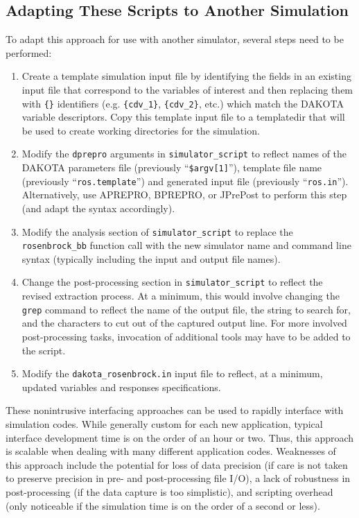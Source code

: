 \subsection{Adapting These Scripts to Another Simulation}

To adapt this approach for use with another simulator, several steps
need to be performed:

\begin{enumerate}
\item Create a template simulation input file by identifying the fields
  in an existing input file that correspond to the variables of
  interest and then replacing them with \texttt{\{\}} identifiers
  (e.g. \texttt{\{cdv\_1\}}, \texttt{\{cdv\_2\}}, etc.) which match
  the DAKOTA variable descriptors. Copy this template input file to a
  templatedir that will be used to create working directories for the
  simulation.

\item Modify the \texttt{dprepro} arguments in
  \texttt{simulator\_script} to reflect names of the DAKOTA parameters
  file (previously ``\texttt{\$argv[1]}''), template file name
  (previously ``\texttt{ros.template}'') and generated input file
  (previously ``\texttt{ros.in}''). Alternatively, use APREPRO,
  BPREPRO, or JPrePost to perform this step (and adapt the syntax
  accordingly).

\item Modify the analysis section of \texttt{simulator\_script} to
  replace the \texttt{rosenbrock\_bb} function call with the new
  simulator name and command line syntax (typically including the
  input and output file names).

\item Change the post-processing section in \texttt{simulator\_script}
  to reflect the revised extraction process. At a minimum, this would
  involve changing the \texttt{grep} command to reflect the name of
  the output file, the string to search for, and the characters to cut
  out of the captured output line. For more involved post-processing
  tasks, invocation of additional tools may have to be added to the
  script.

\item Modify the \texttt{dakota\_rosenbrock.in} input file to reflect,
  at a minimum, updated variables and responses specifications.
\end{enumerate}

These nonintrusive interfacing approaches can be used to rapidly
interface with simulation codes. While generally custom for each new
application, typical interface development time is on the order of an
hour or two. Thus, this approach is scalable when dealing with many
different application codes. Weaknesses of this approach include the
potential for loss of data precision (if care is not taken to preserve
precision in pre- and post-processing file I/O), a lack of robustness
in post-processing (if the data capture is too simplistic), and
scripting overhead (only noticeable if the simulation time is on the
order of a second or less).

